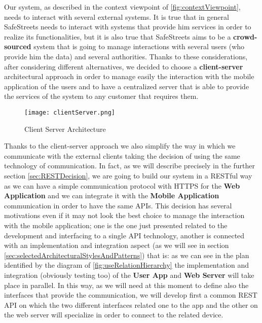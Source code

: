 			Our system, as described in the context viewpoint of \autoref{fig:contextViewpoint}, needs to interact with several external systems. It is true that in general SafeStreets needs to interact with systems that provide him services in order to realize its functionalities, but it is also true that SafeStreets aims to be a \textbf{crowd-sourced} system that is going to manage interactions with several users (who provide him the data) and several authorities. Thanks to these considerations, after considering different alternatives, we decided to choose a \textbf{client-server} architectural approach in order to manage easily the interaction with the mobile application of the users and to have a centralized server that is able to provide the services of the system to any customer that requires them.
			
			\begin{figure}[h!]
				\centering
				\texttt{[image: clientServer.png]}
				\caption{\label{fig:clientServerArchitecture} Client Server Architecture}
			\end{figure}

			Thanks to the client-server approach we also simplify the way in which we communicate with the external clients taking the decision of using the same technology of communication. In fact, as we will describe precisely in the further section \ref{sec:RESTDecision}, we are going to build our system in a RESTful way as we can have a simple communication protocol with HTTPS for the \textbf{Web Application} and we can integrate it with the \textbf{Mobile Application} communication in order to have the same APIs. This decision has several motivations even if it may not look the best choice to manage the interaction with the mobile application; one is the one just presented related to the development and interfacing to a single API technology, another is connected with an implementation and integration aspect (as we will see in section \ref{sec:selectedArchitecturalStylesAndPatterns}) that is: as we can see in the plan identified by the diagram of \autoref{fig:useRelationHierarchy} the implementation and integration (obviously testing too) of the \textbf{User App} and \textbf{Web Server} will take place in parallel. In this way, as we will need at this moment to define also the interfaces that provide the communication, we will develop first a common REST API on which the two different interfaces related one to the app and the other on the web server will specialize in order to connect to the related device.\\
			
